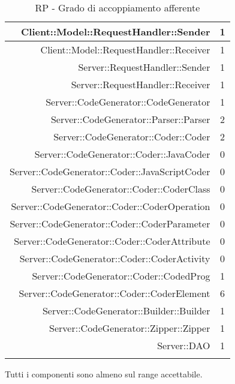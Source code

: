 \documentclass[../PianoDiQualifica.tex]{subfiles}
\begin{document}
\begin{longtable}{|r|c|}
					Client::Model::RequestHandler::Sender & 1 \\ \hline
					Client::Model::RequestHandler::Receiver & 1 \\ \hline
					Server::RequestHandler::Sender & 1 \\ \hline
					Server::RequestHandler::Receiver & 1 \\ \hline
					Server::CodeGenerator::CodeGenerator & 1 \\ \hline
					Server::CodeGenerator::Parser::Parser & 2 \\ \hline
					Server::CodeGenerator::Coder::Coder & 2 \\ \hline
					Server::CodeGenerator::Coder::JavaCoder & 0 \\ \hline
					Server::CodeGenerator::Coder::JavaScriptCoder & 0 \\ \hline
					Server::CodeGenerator::Coder::CoderClass & 0 \\ \hline
					Server::CodeGenerator::Coder::CoderOperation & 0 \\ \hline
					Server::CodeGenerator::Coder::CoderParameter & 0 \\ \hline
					Server::CodeGenerator::Coder::CoderAttribute & 0 \\ \hline
					Server::CodeGenerator::Coder::CoderActivity & 0 \\ \hline
					Server::CodeGenerator::Coder::CodedProg & 1 \\ \hline
					Server::CodeGenerator::Coder::CoderElement & 6 \\ \hline
					Server::CodeGenerator::Builder::Builder & 1 \\ \hline
					Server::CodeGenerator::Zipper::Zipper & 1 \\ \hline
					Server::DAO & 1 \\ \hline
				\caption{RP - Grado di accoppiamento afferente}
				\end{longtable}
				Tutti i componenti sono almeno sul range accettabile.
\end{document}
